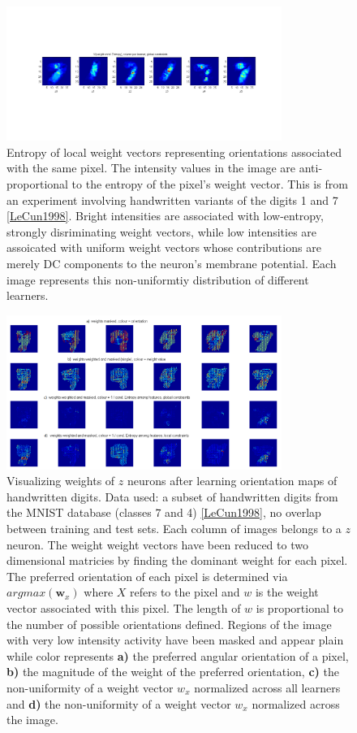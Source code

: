 \documentclass{report}
\begin{document}
\begin{figure}[ht]
\centering
\includegraphics[width=0.8\textwidth]{weightCondEntropy}
\caption{Entropy of local weight vectors representing orientations associated with the same pixel. The intensity values in the image are anti-proportional to the entropy of the pixel's weight vector. This is from an experiment involving handwritten variants of the digits 1 and 7 \cref{LeCun1998}. Bright intensities are associated with low-entropy, strongly disriminating weight vectors, while low intensities are assoicated with uniform weight vectors whose contributions are merely DC components to the neuron's membrane potential. Each image represents this non-uniformtiy distribution of different learners.
\label{fig:weightCondEntropy}}
\end{figure}

\begin{figure}[ht]
\centering
\includegraphics[width=0.8\textwidth]{weightMaps47_masked}
\caption{Visualizing weights of $z$ neurons after learning orientation maps of handwritten digits. Data used: a subset of handwritten digits from the MNIST database (classes 7 and 4) \cref{LeCun1998}, no overlap between training and test sets. Each column of images belongs to a $z$ neuron. The weight weight vectors have been reduced to two dimensional matricies by finding the dominant weight for each pixel. The preferred orientation of each pixel is determined via $argmax(\textbf{w}_x)$ where $X$ refers to the pixel and $w$ is the weight vector associated with this pixel. The length of \textbf{$w$} is proportional to the number of possible orientations defined. Regions of the image with very low intensity activity have been masked and appear plain while color represents  \textbf{a)} the preferred angular orientation of a pixel, \textbf{b)} the magnitude of the weight of the preferred orientation, \textbf{c)} the non-uniformity of a weight vector \textbf{$w_x$} normalized across all learners and \textbf{d)} the non-uniformity of a weight vector \textbf{$w_x$} normalized across the image. 
\label{fig:weightMaps47_masked}}
\end{figure}
\end{document}
